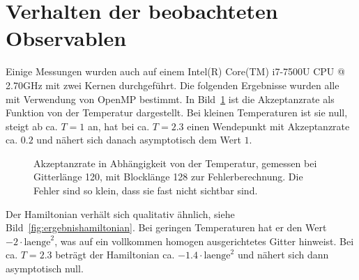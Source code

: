 
	
	
	
	\section{Verhalten der beobachteten Observablen}
	\label{sec:ergebnisobservablen}
	
	Einige Messungen wurden auch auf einem Intel(R) Core(TM) i7-7500U CPU @ 2.70GHz mit zwei Kernen durchgeführt. Die folgenden Ergebnisse wurden alle mit Verwendung von OpenMP bestimmt.
	In Bild~\ref{fig:ergebnisakzeptanzrate} ist die Akzeptanzrate als Funktion von der Temperatur dargestellt. Bei kleinen Temperaturen ist sie null, steigt ab ca. $T=1$ an, hat bei ca. $T=\num{2,3}$ einen Wendepunkt mit Akzeptanzrate ca. $\num{0,2}$ und nähert sich danach asymptotisch dem Wert $1$. 
	
	
	\begin{figure}[htbp]
		
		\caption[Akzeptanzrate in Abhängigkeit von der Temperatur]{Akzeptanzrate in Abhängigkeit von der Temperatur, gemessen bei Gitterlänge 120, mit Blocklänge 128 zur Fehlerberechnung. Die Fehler sind so klein, dass sie fast nicht sichtbar sind.}
		\label{fig:ergebnisakzeptanzrate}
	\end{figure}
	
	Der Hamiltonian verhält sich qualitativ ähnlich, siehe Bild~\ref{fig:ergebnishamiltonian}. Bei geringen Temperaturen hat er den Wert $-2\cdot\text{laenge}^2$, was auf ein vollkommen homogen ausgerichtetes Gitter hinweist. Bei ca.{} $T=\num{2,3}$ beträgt der Hamiltonian ca.{} $-\num{1,4}\cdot\text{laenge}^2$ und nähert sich dann asymptotisch null.
	
